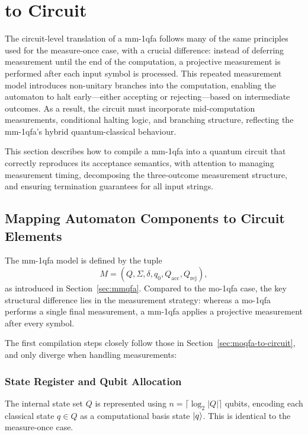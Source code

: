 \section{ to Circuit}
\label{sec:mmqfa-to-circuit}


The circuit-level translation of a \gls{mm-1qfa} follows many of the same principles used for the measure-once case, with a crucial difference: instead of deferring measurement until the end of the computation, a projective measurement is performed after each input symbol is processed. This repeated measurement model introduces non-unitary branches into the computation, enabling the automaton to halt early—either accepting or rejecting—based on intermediate outcomes. As a result, the circuit must incorporate mid-computation measurements, conditional halting logic, and branching structure, reflecting the \gls{mm-1qfa}'s hybrid quantum-classical behaviour.

This section describes how to compile a \gls{mm-1qfa} into a quantum circuit that correctly reproduces its acceptance semantics, with attention to managing measurement timing, decomposing the three-outcome measurement structure, and ensuring termination guarantees for all input strings.

\subsection{Mapping Automaton Components to Circuit Elements}
\label{sec:mmqfa-mapping}

The \gls{mm-1qfa} model is defined by the tuple
\[
M = (Q, \Sigma, \delta, q_0, Q_{\text{acc}}, Q_{\text{rej}}),
\]
as introduced in Section~\ref{sec:mmqfa}. Compared to the \gls{mo-1qfa} case, the key structural difference lies in the measurement strategy: whereas a \gls{mo-1qfa} performs a single final measurement, a \gls{mm-1qfa} applies a projective measurement after every symbol.

The first compilation steps closely follow those in Section~\ref{sec:moqfa-to-circuit}, and only diverge when handling measurements:

\subsubsection*{State Register and Qubit Allocation}
The internal state set $Q$ is represented using $n = \lceil \log_2 |Q| \rceil$ qubits, encoding each classical state $q \in Q$ as a computational basis state $\ket{q}$. This is identical to the measure-once case.

